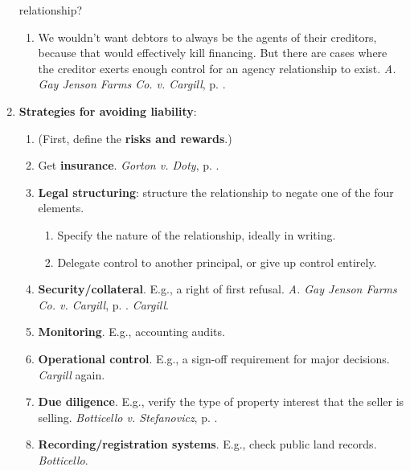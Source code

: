 \begin{enumerate}
    relationship?
    \begin{enumerate}
        \item We wouldn't want debtors to always be the agents of their 
        creditors, because that would effectively kill financing. But there 
        are cases where the creditor exerts enough control for an agency 
        relationship to exist. \emph{A. Gay Jenson Farms Co. v. Cargill}, p. 
        \pageref{subsub:cargill}.
    \end{enumerate}
    \item \textbf{Strategies for avoiding liability}:
    \begin{enumerate}
        \item (First, define the \textbf{risks and rewards}.)
        \item Get \textbf{insurance}. \emph{Gorton v. Doty}, p.
        \pageref{subsub:gorton}.
        \item \textbf{Legal structuring}: structure the relationship to negate 
        one of the four elements.
        \begin{enumerate}
            \item Specify the nature of the relationship, ideally in writing.
            \item Delegate control to another principal, or give up control 
            entirely.
        \end{enumerate}
        \item \textbf{Security/collateral}. E.g., a right of first refusal. 
        \emph{A. Gay Jenson Farms Co. v. Cargill}, p.  
        \pageref{subsub:cargill}. \emph{Cargill}.
        \item \textbf{Monitoring}. E.g., accounting audits.
        \item \textbf{Operational control}. E.g., a sign-off requirement for 
        major decisions. \emph{Cargill} again.
        \item \textbf{Due diligence}. E.g., verify the type of property 
        interest that the seller is selling. \emph{Botticello v. Stefanovicz}, 
        p. \pageref{par:botticello}.
        \item \textbf{Recording/registration systems}. E.g., check public land 
        records. \emph{Botticello}.
    \end{enumerate}
\end{enumerate}

